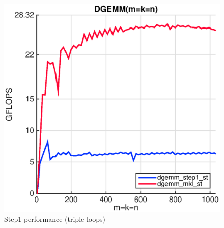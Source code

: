 %
%
%
%
%
%
%


\begin{figure}[!htp]
  \centering
  \includegraphics[scale=.5]{figures/step1_single_thread_ivy.eps}
  \caption{Step1 performance (triple loops)}
  \label{fig:naive}
\end{figure} 

